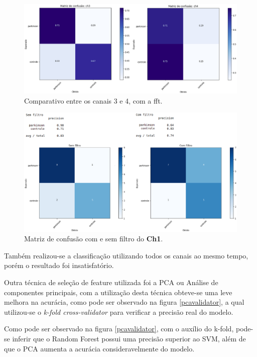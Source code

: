 \begin{figure}[!htb]
    \centering
    \includegraphics[width=1.1\textwidth]{figuras/CH34Comp.eps}
    \caption{Comparativo entre os canais 3 e 4, com a fft.}
    \label{fcomparativo}
\end{figure}


\begin{figure}[!htb]
    \centering
    \includegraphics[width=1.1\textwidth]{figuras/filtroComp.eps}
    \caption{Matriz de confusão com e sem filtro do \textbf{Ch1}.}
    \label{comesemfiltro}
\end{figure}

Também realizou-se a classificação utilizando todos os canais ao mesmo tempo, porém o resultado foi insatisfatório.

Outra técnica de seleção de feature utilizada foi a PCA ou Análise de componentes principais, com a utilização desta técnica obteve-se uma leve melhora na acurácia, como pode ser observado na figura \ref{pcavalidator}, a qual utilizou-se o \textit{k-fold cross-validator} para verificar a precisão real do modelo.

Como pode ser observado na figura \ref{pcavalidator}, com o auxílio do k-fold, pode-se inferir que o Random Forest possui uma precisão superior ao SVM, além de que o PCA aumenta a acurácia consideravelmente do modelo.

